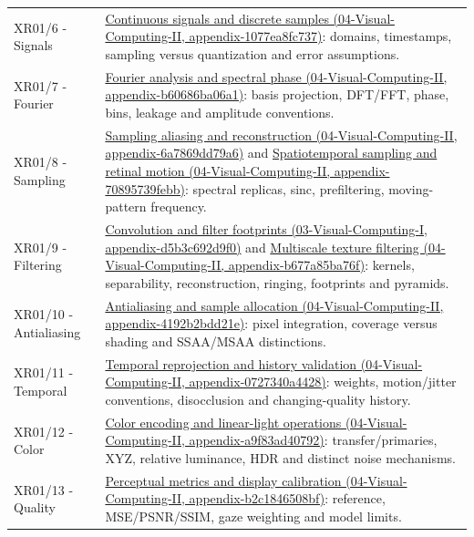 {\begin{longtable}[]{@{}
  >{\raggedright\arraybackslash}p{}
  >{\raggedright\arraybackslash}p{}@{}}
XR01/6 - Signals & \href{../04-Visual-Computing-II/main.pdf\#nameddest=appendix-1077ea8fc737}{Continuous signals and discrete samples (04-Visual-Computing-II, appendix-1077ea8fc737)}: domains, timestamps, sampling versus quantization and error assumptions. \\
XR01/7 - Fourier & \href{../04-Visual-Computing-II/main.pdf\#nameddest=appendix-b60686ba06a1}{Fourier analysis and spectral phase (04-Visual-Computing-II, appendix-b60686ba06a1)}: basis projection, DFT/FFT, phase, bins, leakage and amplitude conventions. \\
XR01/8 - Sampling & \href{../04-Visual-Computing-II/main.pdf\#nameddest=appendix-6a7869dd79a6}{Sampling aliasing and reconstruction (04-Visual-Computing-II, appendix-6a7869dd79a6)} and \href{../04-Visual-Computing-II/main.pdf\#nameddest=appendix-70895739febb}{Spatiotemporal sampling and retinal motion (04-Visual-Computing-II, appendix-70895739febb)}: spectral replicas, sinc, prefiltering, moving-pattern frequency. \\
XR01/9 - Filtering & \href{../03-Visual-Computing-I/main.pdf\#nameddest=appendix-d5b3c692d9f0}{Convolution and filter footprints (03-Visual-Computing-I, appendix-d5b3c692d9f0)} and \href{../04-Visual-Computing-II/main.pdf\#nameddest=appendix-b677a85ba76f}{Multiscale texture filtering (04-Visual-Computing-II, appendix-b677a85ba76f)}: kernels, separability, reconstruction, ringing, footprints and pyramids. \\
XR01/10 - Antialiasing & \href{../04-Visual-Computing-II/main.pdf\#nameddest=appendix-4192b2bdd21e}{Antialiasing and sample allocation (04-Visual-Computing-II, appendix-4192b2bdd21e)}: pixel integration, coverage versus shading and SSAA/MSAA distinctions. \\
XR01/11 - Temporal & \href{../04-Visual-Computing-II/main.pdf\#nameddest=appendix-0727340a4428}{Temporal reprojection and history validation (04-Visual-Computing-II, appendix-0727340a4428)}: weights, motion/jitter conventions, disocclusion and changing-quality history. \\
XR01/12 - Color & \href{../04-Visual-Computing-II/main.pdf\#nameddest=appendix-a9f83ad40792}{Color encoding and linear-light operations (04-Visual-Computing-II, appendix-a9f83ad40792)}: transfer/primaries, XYZ, relative luminance, HDR and distinct noise mechanisms. \\
XR01/13 - Quality & \href{../04-Visual-Computing-II/main.pdf\#nameddest=appendix-b2c1846508bf}{Perceptual metrics and display calibration (04-Visual-Computing-II, appendix-b2c1846508bf)}: reference, MSE/PSNR/SSIM, gaze weighting and model limits. \\

\end{longtable}}
